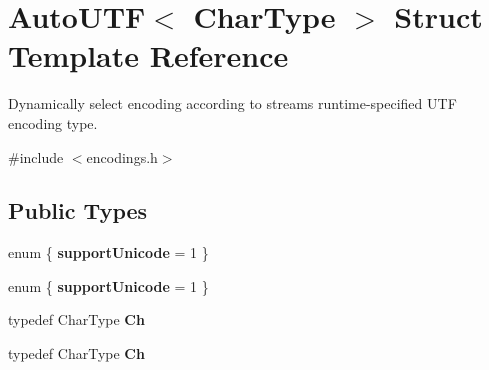 \hypertarget{struct_auto_u_t_f}{}\section{Auto\+U\+TF$<$ Char\+Type $>$ Struct Template Reference}
\label{struct_auto_u_t_f}


Dynamically select encoding according to stream\textquotesingle{}s runtime-\/specified U\+TF encoding type.  




{\ttfamily \#include $<$encodings.\+h$>$}

\subsection*{Public Types}
\begin{DoxyCompactItemize}
\item 
enum \{ {\bfseries support\+Unicode} = 1
 \}\hypertarget{struct_auto_u_t_f_a678e20a7f8d022be68adbb49fa56a094}{}\label{struct_auto_u_t_f_a678e20a7f8d022be68adbb49fa56a094}

\item 
enum \{ {\bfseries support\+Unicode} = 1
 \}\hypertarget{struct_auto_u_t_f_a768e3aeaf539ae67090723b0547867ad}{}\label{struct_auto_u_t_f_a768e3aeaf539ae67090723b0547867ad}

\item 
typedef Char\+Type {\bfseries Ch}\hypertarget{struct_auto_u_t_f_a0609343de776df3bc31b4c980eb3cf1c}{}\label{struct_auto_u_t_f_a0609343de776df3bc31b4c980eb3cf1c}

\item 
typedef Char\+Type {\bfseries Ch}\hypertarget{struct_auto_u_t_f_a0609343de776df3bc31b4c980eb3cf1c}{}\label{struct_auto_u_t_f_a0609343de776df3bc31b4c980eb3cf1c}

\end{DoxyCompactItemize}
